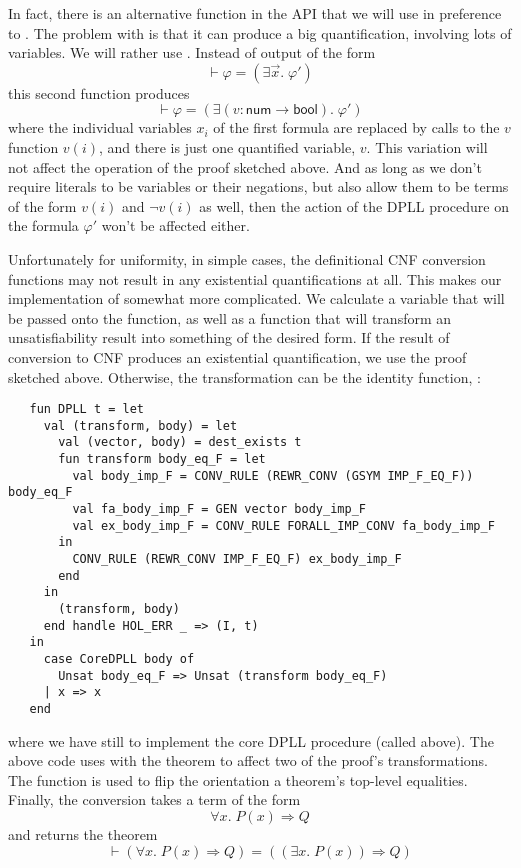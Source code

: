 In fact, there is an alternative function in the  API that
we will use in preference to .   The problem with
 is that it can produce a big quantification,
involving lots of variables.  We will rather use
.  Instead of output of the form
\[
\vdash \varphi = (\exists \vec{x}.\; \varphi')
\]
this second function produces
\[
\vdash \varphi = (\exists (v : \textsf{num} \rightarrow
\textsf{bool}).\; \varphi')
\]
where the individual variables $x_i$ of the first formula are replaced
by calls to the $v$ function $v(i)$, and there is just one quantified
variable, $v$.  This variation will not affect the operation of the
proof sketched above.  And as long as we don't require literals to be
variables or their negations, but also allow them to be terms of
the form $v(i)$ and $\neg v(i)$ as well, then the action of the DPLL
procedure on the formula $\varphi'$ won't be affected either.

Unfortunately for uniformity, in simple cases, the definitional CNF
conversion functions may not result in any existential
quantifications at all.  This makes our implementation of 
somewhat more complicated.  We calculate a  variable that
will be passed onto the  function, as well as a
 function that will transform an unsatisfiability result
into something of the desired form.  If the result of conversion to
CNF produces an existential quantification, we use the proof sketched
above.  Otherwise, the transformation can be the identity function,
:
\begin{hol}
\begin{verbatim}
   fun DPLL t = let
     val (transform, body) = let
       val (vector, body) = dest_exists t
       fun transform body_eq_F = let
         val body_imp_F = CONV_RULE (REWR_CONV (GSYM IMP_F_EQ_F)) body_eq_F
         val fa_body_imp_F = GEN vector body_imp_F
         val ex_body_imp_F = CONV_RULE FORALL_IMP_CONV fa_body_imp_F
       in
         CONV_RULE (REWR_CONV IMP_F_EQ_F) ex_body_imp_F
       end
     in
       (transform, body)
     end handle HOL_ERR _ => (I, t)
   in
     case CoreDPLL body of
       Unsat body_eq_F => Unsat (transform body_eq_F)
     | x => x
   end
\end{verbatim}
\end{hol}
where we have still to implement the core DPLL procedure (called
 above).  The above code uses  with the
 theorem to affect two of the proof's
transformations.  The  function is used to flip the
orientation a theorem's top-level equalities.  Finally, the
 conversion takes a term of the form
\[
\forall x.\;P(x) \Rightarrow Q
\]
and returns the theorem
\[
\vdash (\forall x.\;P(x) \Rightarrow Q) = ((\exists
x.\;P(x))\Rightarrow Q)
\]




